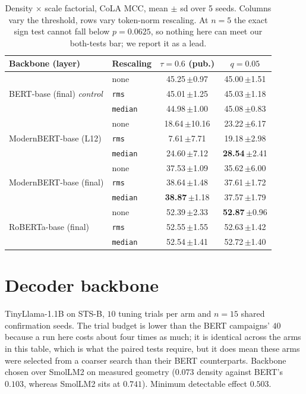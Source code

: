 \documentclass{article}
\begin{document}
\begin{table}[h]
\caption{Density $\times$ scale factorial, CoLA MCC, mean $\pm$ sd over 5 seeds.
Columns vary the threshold, rows vary token-norm rescaling. At $n=5$ the exact
sign test cannot fall below $p=0.0625$, so nothing here can meet our both-tests
bar; we report it as a lead.}
\label{tab:fix}
\begin{center}
\small
\begin{tabular}{llcc}
\toprule
Backbone (layer) & Rescaling & $\tau=0.6$ (pub.) & $q=0.05$ \\
\midrule
\multirow{3}{*}{BERT-base (final) \emph{control}}
  & none            & 45.25\,$\pm$0.97 & 45.00\,$\pm$1.51 \\
  & \texttt{rms}    & 45.01\,$\pm$1.25 & 45.03\,$\pm$1.18 \\
  & \texttt{median} & 44.98\,$\pm$1.00 & 45.08\,$\pm$0.83 \\
\midrule
\multirow{3}{*}{ModernBERT-base (L12)}
  & none            & 18.64\,$\pm$10.16 & 23.22\,$\pm$6.17 \\
  & \texttt{rms}    & \phantom{0}7.61\,$\pm$7.71 & 19.18\,$\pm$2.98 \\
  & \texttt{median} & 24.60\,$\pm$7.12 & \textbf{28.54}\,$\pm$2.41 \\
\midrule
\multirow{3}{*}{ModernBERT-base (final)}
  & none            & 37.53\,$\pm$1.09 & 35.62\,$\pm$6.00 \\
  & \texttt{rms}    & 38.64\,$\pm$1.48 & 37.61\,$\pm$1.72 \\
  & \texttt{median} & \textbf{38.87}\,$\pm$1.18 & 37.57\,$\pm$1.79 \\
\midrule
\multirow{3}{*}{RoBERTa-base (final)}
  & none            & 52.39\,$\pm$2.33 & \textbf{52.87}\,$\pm$0.96 \\
  & \texttt{rms}    & 52.55\,$\pm$1.55 & 52.63\,$\pm$1.42 \\
  & \texttt{median} & 52.54\,$\pm$1.41 & 52.72\,$\pm$1.40 \\
\bottomrule
\end{tabular}
\end{center}
\end{table}

\section{Decoder backbone}
\label{app:decoder}

TinyLlama-1.1B on STS-B, $10$ tuning trials per arm and $n=15$ shared
confirmation seeds. The trial budget is lower than the BERT campaigns' $40$
because a run here costs about four times as much; it is identical across the
arms in this table, which is what the paired tests require, but it does mean
these arms were selected from a coarser search than their BERT counterparts.
Backbone chosen over SmolLM2 on measured geometry ($0.073$ density against
BERT's $0.103$, whereas SmolLM2 sits at $0.741$). Minimum detectable effect
$0.503$.
\end{document}
